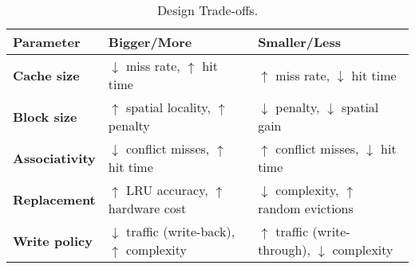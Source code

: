 \begin{table}[!htp]
    \centering
    \begin{adjustbox}{width={\textwidth},totalheight={\textheight},keepaspectratio}
        \begin{tabular}{@{} l | l | l @{}}
            \toprule
            Parameter & Bigger/More & Smaller/Less \\
            \midrule
            \textbf{Cache size}     & $\downarrow$ miss rate, $\uparrow$ hit time               & $\uparrow$ miss rate, $\downarrow$ hit time                   \\ [.3em]
            \textbf{Block size}     & $\uparrow$ spatial locality, $\uparrow$ penalty           & $\downarrow$ penalty, $\downarrow$ spatial gain               \\ [.3em]
            \textbf{Associativity}  & $\downarrow$ conflict misses, $\uparrow$ hit time         & $\uparrow$ conflict misses, $\downarrow$ hit time             \\ [.3em]
            \textbf{Replacement}    & $\uparrow$ LRU accuracy, $\uparrow$ hardware cost         & $\downarrow$ complexity, $\uparrow$ random evictions          \\ [.3em]
            \textbf{Write policy}   & $\downarrow$ traffic (write-back), $\uparrow$ complexity  & $\uparrow$ traffic (write-through), $\downarrow$ complexity   \\
            \bottomrule
        \end{tabular}
    \end{adjustbox}
    \caption{Design Trade-offs.}
\end{table}